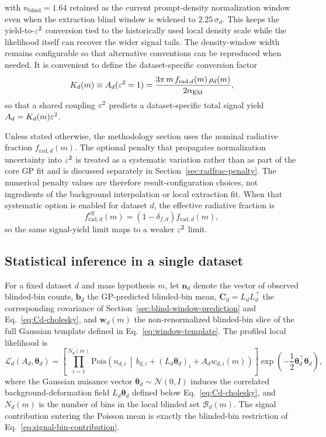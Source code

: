 with $n_{\mathrm{blind}}=1.64$ retained as the current prompt-density normalization
window even when the extraction blind window is widened to $2.25\,\sigma_d$. This keeps
the yield-to-$\varepsilon^2$ conversion tied to the historically used local density scale while
the likelihood itself can recover the wider signal tails. The density-window width
remains configurable so that alternative conventions can be reproduced when needed.
It is convenient to define the
dataset-specific conversion factor
\begin{equation}
K_d(m) \equiv A_d(\varepsilon^2 = 1)
= \frac{3\pi\,m\,f_{\mathrm{rad},d}(m)\,\rho_d(m)}{2\alpha_{\mathrm{EM}}},
\label{eq:Kd-conversion}
\end{equation}
so that a shared coupling $\varepsilon^2$ predicts a dataset-specific total signal yield
$A_d = K_d(m)\varepsilon^2$.

Unless stated otherwise, the methodology section uses the nominal radiative fraction
$f_{\mathrm{rad},d}(m)$. The optional penalty that propagates normalization uncertainty
into $\varepsilon^2$ is treated as a systematic variation rather than as part of the core GP
fit and is discussed separately in Section~\ref{sec:radfrac-penalty}. The numerical
penalty values are therefore result-configuration choices, not ingredients of the
background interpolation or local extraction fit. When that systematic option is
enabled for dataset $d$, the effective radiative fraction is
\begin{equation}
f_{\mathrm{rad},d}^{\mathrm{eff}}(m)
= \left(1-\delta_{f,d}\right) f_{\mathrm{rad},d}(m),
\end{equation}
so the same signal-yield limit maps to a weaker $\varepsilon^2$ limit.

\subsection{Statistical inference in a single dataset}

For a fixed dataset $d$ and mass hypothesis $m$, let $\bm{n}_d$ denote the vector of
observed blinded-bin counts, $\bm{b}_d$ the GP-predicted blinded-bin mean,
$\bm{C}_d=L_dL_d^\top$ the corresponding covariance of
Section~\ref{sec:blind-window-prediction} and Eq.~\eqref{eq:Cd-cholesky}, and
$\bm{w}_d(m)$ the
non-renormalized blinded-bin slice of the full Gaussian template defined in
Eq.~\eqref{eq:window-template}. The profiled local likelihood is
\begin{equation}
\mathcal{L}_d(A_d,\bm{\theta}_d)
=
\left[
\prod_{i=1}^{N_d(m)}
\mathrm{Pois}\!\left(
n_{d,i}\,\middle|\,
b_{d,i} + (L_d\bm{\theta}_d)_i + A_d w_{d,i}(m)
\right)
\right]
\exp\!\left(-\frac{1}{2}\bm{\theta}_d^\top\bm{\theta}_d\right),
\label{eq:singlelike}
\end{equation}
where the Gaussian nuisance vector $\bm{\theta}_d\sim\mathcal{N}(0,I)$ induces the
correlated background-deformation field $L_d\bm{\theta}_d$ defined below
Eq.~\eqref{eq:Cd-cholesky}, and $N_d(m)$ is the number of bins in the local blinded
set $\mathcal{B}_d(m)$. The signal contribution entering the Poisson mean is exactly
the blinded-bin restriction of Eq.~\eqref{eq:signal-bin-contribution}.


